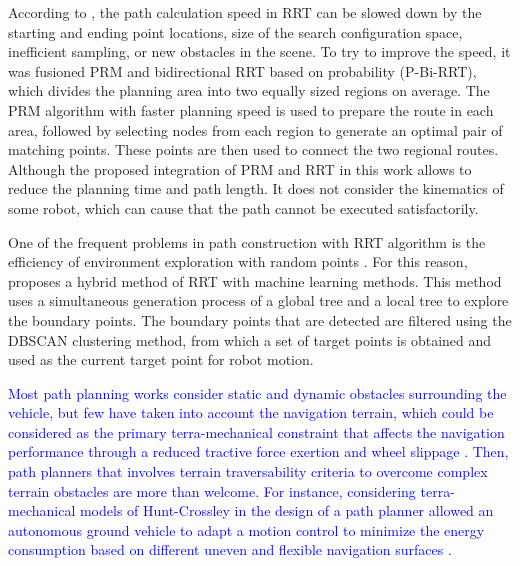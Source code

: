 \documentclass[conference]{IEEEtran}
\newcommand{\revJ}[1]{\textcolor{red}{#1}}
\begin{document}
According to \cite{Xu2020}, the path calculation speed in RRT can be slowed down by the starting and ending point locations, size of the search configuration space, inefficient sampling, or new obstacles in the scene. To try to improve the speed, it was fusioned PRM and bidirectional RRT based on probability (P-Bi-RRT), which divides the planning area into two equally sized regions on average. The PRM algorithm with faster planning speed is used to prepare the route in each area, followed by selecting nodes from each region to generate an optimal pair of matching points. These points are then used to connect the two regional routes. Although the proposed integration of PRM and RRT in this work allows to reduce the planning time and path length. It does not consider the kinematics of some robot, which can cause that the path cannot be executed satisfactorily. 


One of the frequent problems in path construction with RRT algorithm is the efficiency of environment exploration with random points  \cite{Wang2022_Path}. For this reason, \cite{Chen2020} proposes a hybrid method of RRT with machine learning methods. This method uses a simultaneous generation process of a global tree and a local tree to explore the boundary points. The boundary points that are detected are filtered using the DBSCAN clustering method, from which a set of target points is obtained and used as the current target point for robot motion.


\textcolor{blue}{Most path planning works consider static and dynamic obstacles surrounding the vehicle, but few have taken into account the navigation terrain, which could be considered as the primary terra-mechanical constraint that affects the navigation performance through a reduced tractive force exertion and wheel slippage \cite{Prado2021}. Then, path planners that involves terrain traversability criteria to overcome complex terrain obstacles are more than welcome. For instance, considering terra-mechanical models of Hunt-Crossley in the design of a path planner allowed an autonomous ground vehicle to adapt a motion control to minimize the energy consumption based on different uneven and flexible navigation surfaces} \cite{10011864}. 


\end{document}
